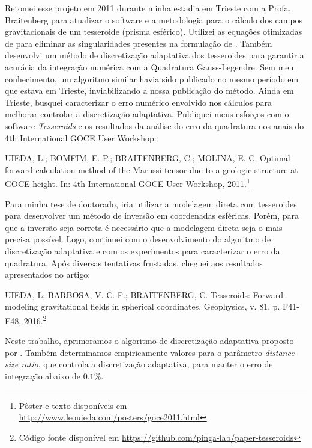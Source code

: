 Retomei esse projeto em 2011 durante minha estadia em Trieste com a Profa.
Braitenberg para atualizar o software e a metodologia para o cálculo dos campos
gravitacionais de um tesseroide (prisma esférico).
Utilizei as equações otimizadas de \citet{grombein2013} para eliminar
as singularidades presentes na formulação de \citet{wild-pfeiffer2008}.
Também desenvolvi um método de discretização adaptativa dos tesseroides para
garantir a acurácia da integração numérica com a Quadratura Gauss-Legendre.
Sem meu conhecimento, um algoritmo similar \citep{li2011} havia sido publicado
no mesmo período em que estava em Trieste, inviabilizando a nossa publicação do
método.
Ainda em Trieste, busquei caracterizar o erro numérico envolvido
nos cálculos para melhorar controlar a discretização adaptativa.
Publiquei meus esforços com o software \textit{Tesseroids} e os resultados da
análise do erro da quadratura nos anais do 4th International GOCE User
Workshop:

\begin{displayquote}
    UIEDA, L.; BOMFIM, E. P.; BRAITENBERG, C.; MOLINA, E. C. Optimal
    forward calculation method of the Marussi tensor due to a geologic
    structure at GOCE height. In: 4th International GOCE User Workshop,
    2011.\footnote{Pôster e texto disponíveis em
    \url{http://www.leouieda.com/posters/goce2011.html}}
\end{displayquote}

Para minha tese de doutorado, iria utilizar a modelagem direta com tesseroides
para desenvolver um método de inversão em coordenadas esféricas.
Porém, para que a inversão seja correta é necessário que a modelagem direta
seja o mais precisa possível.
Logo, continuei com o desenvolvimento do algoritmo de discretização adaptativa
e com os experimentos para caracterizar o erro da quadratura.
Após diversas tentativas frustadas, cheguei aos resultados apresentados no
artigo:

\begin{displayquote}
    UIEDA, L; BARBOSA, V. C. F.; BRAITENBERG, C. Tesseroids:
    Forward-modeling gravitational fields in spherical coordinates. Geophysics,
    v. 81, p. F41-F48, 2016.\footnote{Código fonte disponível em
    \url{https://github.com/pinga-lab/paper-tesseroids}}
\end{displayquote}

Neste trabalho, aprimoramos o algoritmo de discretização adaptativa proposto
por \citet{li2011}.
Também determinamos empiricamente valores para o parâmetro
\textit{distance-size ratio}, que controla a discretização adaptativa,
para manter o erro de integração abaixo de $0.1\%$.

